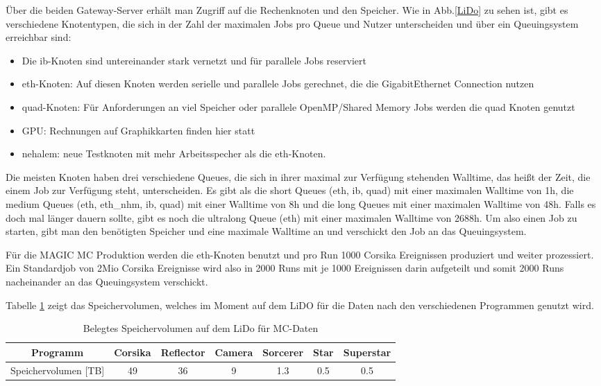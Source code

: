 Über die beiden Gateway-Server erhält man Zugriff auf die Rechenknoten und den Speicher.
Wie in Abb.\ref{LiDo} zu sehen ist, gibt es verschiedene Knotentypen, die sich in der Zahl der maximalen Jobs pro Queue und Nutzer unterscheiden und über ein Queuingsystem erreichbar sind:

\begin{itemize}
 \item Die ib-Knoten sind untereinander stark vernetzt und für parallele Jobs reserviert
 \item eth-Knoten: Auf diesen Knoten werden serielle und parallele Jobs gerechnet, die die GigabitEthernet Connection nutzen
 \item quad-Knoten: Für Anforderungen an viel Speicher oder parallele OpenMP/Shared Memory Jobs werden die quad Knoten genutzt
 \item GPU: Rechnungen auf Graphikkarten finden hier statt
 \item nehalem: neue Testknoten mit mehr Arbeitsspecher als die eth-Knoten.
\end{itemize}

Die meisten Knoten haben drei verschiedene Queues, die sich in ihrer maximal zur Verfügung stehenden Walltime, das heißt der Zeit, die einem Job zur Verfügung steht, unterscheiden.
Es gibt als die short Queues (eth, ib, quad) mit einer maximalen Walltime von 1h, die medium Queues (eth, eth\_nhm, ib, quad) mit einer Walltime von 8h und die long Queues mit einer maximalen Walltime von 48h. 
Falls es doch mal länger dauern sollte, gibt es noch die ultralong Queue (eth) mit einer maximalen Walltime von 2688h.
Um also einen Job zu starten, gibt man den benötigten Speicher und eine maximale Walltime an und verschickt den Job an das Queuingsystem.

Für die MAGIC MC Produktion werden die eth-Knoten benutzt und pro Run 1000 Corsika Ereignissen produziert und weiter prozessiert. 
Ein Standardjob von 2Mio Corsika Ereignisse wird also in 2000 Runs mit je 1000 Ereignissen darin aufgeteilt und somit 2000 Runs nacheinander an das Queuingsystem verschickt.


Tabelle \ref{tab:LiDO} zeigt das Speichervolumen, welches im Moment auf dem LiDO für die Daten nach den verschiedenen Programmen genutzt wird.

\begin{table}[h!]
    \centering
    \caption{Belegtes Speichervolumen auf dem LiDo für MC-Daten}
    \label{tab:LiDO}
    \begin{tabular}{ccccccc}
        \toprule
        Programm & Corsika & Reflector & Camera & Sorcerer & Star & Superstar\\
        \midrule
        Speichervolumen [TB] & 49 & 36 & 9 & 1.3 & 0.5 & 0.5\\
        \bottomrule
    \end{tabular}
\end{table}

